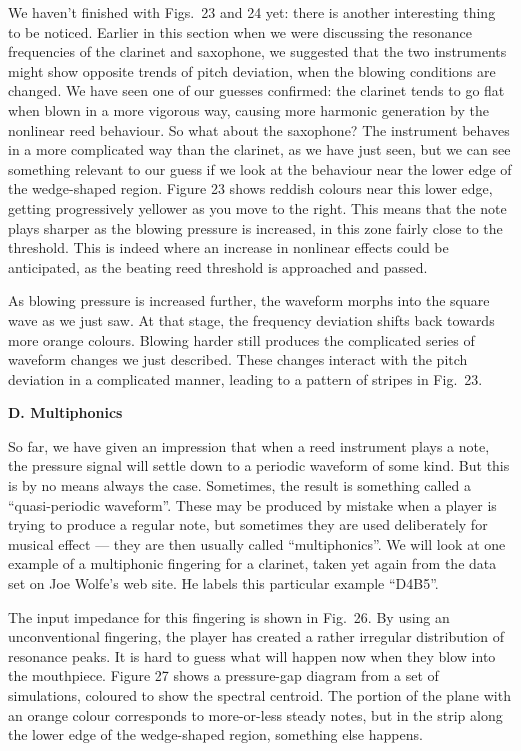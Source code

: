   We haven’t finished with Figs.\ 23 and 24 yet: there is another interesting 
  thing to be noticed. Earlier in this section when we were discussing the 
  resonance frequencies of the clarinet and saxophone, we suggested that the 
  two instruments might show opposite trends of pitch deviation, when the 
  blowing conditions are changed. We have seen one of our guesses confirmed: 
  the clarinet tends to go flat when blown in a more vigorous way, causing more 
  harmonic generation by the nonlinear reed behaviour. So what about the 
  saxophone? The instrument behaves in a more complicated way than the 
  clarinet, as we have just seen, but we can see something relevant to our 
  guess if we look at the behaviour near the lower edge of the wedge-shaped 
  region. Figure 23 shows reddish colours near this lower edge, getting 
  progressively yellower as you move to the right. This means that the note 
  plays sharper as the blowing pressure is increased, in this zone fairly close 
  to the threshold. This is indeed where an increase in nonlinear effects could 
  be anticipated, as the beating reed threshold is approached and passed. 

  As blowing pressure is increased further, the waveform morphs into the square 
  wave as we just saw. At that stage, the frequency deviation shifts back 
  towards more orange colours. Blowing harder still produces the complicated 
  series of waveform changes we just described. These changes interact with the 
  pitch deviation in a complicated manner, leading to a pattern of stripes in 
  Fig.\ 23. 

  \textbf{D. Multiphonics} 

  So far, we have given an impression that when a reed instrument plays a note, 
  the pressure signal will settle down to a periodic waveform of some kind. But 
  this is by no means always the case. Sometimes, the result is something 
  called a “quasi-periodic waveform”. These may be produced by mistake when a 
  player is trying to produce a regular note, but sometimes they are used 
  deliberately for musical effect — they are then usually called 
  “multiphonics”. We will look at one example of a multiphonic fingering for a 
  clarinet, taken yet again from the data set on Joe Wolfe’s web site. He 
  labels this particular example “D4B5”. 

  The input impedance for this fingering is shown in Fig.\ 26. By using an 
  unconventional fingering, the player has created a rather irregular 
  distribution of resonance peaks. It is hard to guess what will happen now 
  when they blow into the mouthpiece. Figure 27 shows a pressure-gap diagram 
  from a set of simulations, coloured to show the spectral centroid. The 
  portion of the plane with an orange colour corresponds to more-or-less steady 
  notes, but in the strip along the lower edge of the wedge-shaped region, 
  something else happens. 

